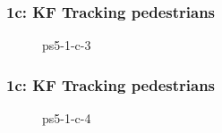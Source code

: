 \documentclass[../report.tex]{subfiles}
\begin{document}
    \begin{frame}
        \frametitle{1c: KF Tracking pedestrians}
        \begin{figure}[!htb]
            \centering
            \caption{ps5-1-c-3} 
        \end{figure}
    \end{frame}

    \begin{frame}
        \frametitle{1c: KF Tracking pedestrians}
        \begin{figure}[!htb]
            \centering
            \caption{ps5-1-c-4}
        \end{figure}
    \end{frame}
    
\end{document}
